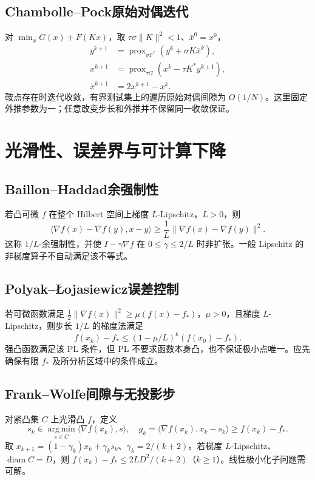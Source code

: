 \documentclass[../main.tex]{subfiles}
\begin{document}
\subsection{Chambolle--Pock原始对偶迭代}
对 $\min_xG(x)+F(Kx)$，取 $\tau\sigma\|K\|^2<1$、$\bar x^0=x^0$，
\begin{align*}
y^{k+1}&=\operatorname{prox}_{\sigma F^*}(y^k+\sigma K\bar x^k),\\
x^{k+1}&=\operatorname{prox}_{\tau G}(x^k-\tau K^*y^{k+1}),\\
\bar x^{k+1}&=2x^{k+1}-x^k.
\end{align*}
鞍点存在时迭代收敛，有界测试集上的遍历原始对偶间隙为 $O(1/N)$。这里固定外推参数为一；任意改变步长和外推并不保留同一收敛保证。
\section{光滑性、误差界与可计算下降}
\subsection{Baillon--Haddad余强制性}
若凸可微 $f$ 在整个 Hilbert 空间上梯度 $L$-Lipschitz，$L>0$，则
\[
\langle\nabla f(x)-\nabla f(y),x-y\rangle
\ge\frac1L\|\nabla f(x)-\nabla f(y)\|^2.
\]
这称 $1/L$-余强制性，并使 $I-\gamma\nabla f$ 在 $0\le\gamma\le2/L$ 时非扩张。一般 Lipschitz 的非梯度算子不自动满足该不等式。
\subsection{Polyak--Łojasiewicz误差控制}
若可微函数满足 $\frac12\|\nabla f(x)\|^2\ge\mu(f(x)-f_*)$，$\mu>0$，且梯度 $L$-Lipschitz，则步长 $1/L$ 的梯度法满足
\[
f(x_k)-f_*\le(1-\mu/L)^k(f(x_0)-f_*).
\]
强凸函数满足该 PL 条件，但 PL 不要求函数本身凸，也不保证极小点唯一。应先确保有限 $f_*$ 及所分析区域中的条件成立。
\subsection{Frank--Wolfe间隙与无投影步}
对紧凸集 $C$ 上光滑凸 $f$，定义
\[
s_k\in\operatorname*{arg\,min}_{s\in C}\langle\nabla f(x_k),s\rangle,\quad
g_k=\langle\nabla f(x_k),x_k-s_k\rangle\ge f(x_k)-f_*.
\]
取 $x_{k+1}=(1-\gamma_k)x_k+\gamma_ks_k$、$\gamma_k=2/(k+2)$。若梯度 $L$-Lipschitz、$\operatorname{diam}C=D$，则 $f(x_k)-f_*\le2LD^2/(k+2)$（$k\ge1$）。线性极小化子问题需可解。
\end{document}
